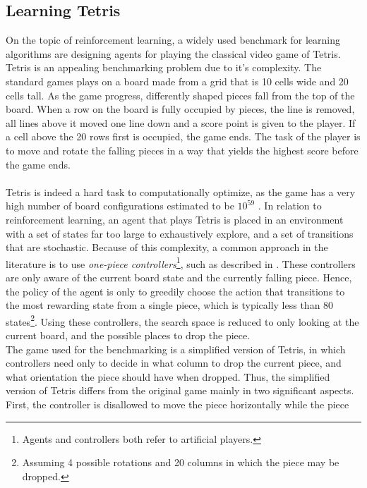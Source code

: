 \subsection{Learning Tetris \label{sec:learningTetris}}

On the topic of reinforcement learning, a widely used benchmark
for learning algorithms are designing agents 
for playing the classical video game of Tetris. Tetris is an 
appealing benchmarking problem due to it's complexity. The 
standard games plays on a board made from a grid that is
10 cells wide and 20 cells tall. As the game progress, differently
shaped pieces fall from the top of the board. 
When a row on the board is fully occupied by pieces, the line
is removed, all lines above it moved one line down and a score
point is given to the player. If a cell above the 20 rows first is
occupied, the game ends. The task of the player is to move
and rotate the falling pieces in a way that yields the highest 
score before the game ends.\\
\\
Tetris is indeed a hard task to computationally optimize, as
the game has a very high number of board configurations estimated to be
$10^{59}$ \citep{scherrer2009}. In relation to reinforcement learning,
an agent that plays Tetris is placed in an environment with a set of 
states far too large to exhaustively explore, and a set of transitions
that are stochastic. Because of this
complexity, a common approach 
in the literature is to use 
\textit{one-piece controllers}\footnote{Agents and controllers
both refer to artificial players.}, such as described in 
\cite{scherrer2009:b}. These controllers are only aware of
the current board state and the currently falling piece.
Hence, the policy of the agent is only to greedily choose
the action that transitions to the most rewarding state
from a single piece, which is typically less than 80 states\footnote{
Assuming 4 possible rotations and 20 columns
in which the piece may be dropped.}.
Using these controllers, the search space is reduced 
to only looking at the current board, and the possible 
places to drop the piece. \\
The game used for the benchmarking is a simplified version of Tetris,
in which 
controllers need only to decide in what column to drop the current
piece, and what orientation the piece should have when dropped.
Thus, the simplified version of Tetris differs from the 
original game mainly in two significant aspects. 
First, the controller is 
disallowed to move the piece horizontally while the piece 
